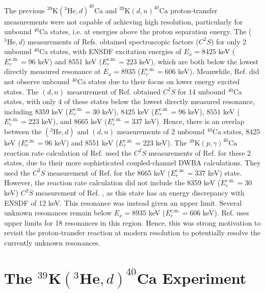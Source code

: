 The previous $^{39}\mathrm{K}(^{3}\mathrm{He},d)^{40}\mathrm{Ca}$ \cite{Erskine1966,Seth1967,Forster1970,Cage1971} and $^{39}\mathrm{K}(d,n)^{40}\mathrm{Ca}$ \cite{Fuchs1969} proton-transfer measurements were not capable of achieving high resolution, particularly for unbound $^{40}$Ca states, i.e. at energies above the proton separation energy. The ($^{3}\mathrm{He},d$) measurements of Refs. \cite{Erskine1966,Seth1967,Cage1971} obtained spectroscopic factors ($C^{2}S$) for only 2 unbound $^{40}$Ca states, with ENSDF \cite{Chen2017} excitation energies of $E_{x} = 8425$ keV ($E^{\mathrm{c.m.}}_{r} = 96$ keV) and 8551 keV ($E^{\mathrm{c.m.}}_{r} = 223$ keV), which are both below the lowest directly measured resonance at $E_{x} = 8935$ ($E^{\mathrm{c.m.}}_{r} = 606$ keV). Meanwhile, Ref. \cite{Forster1970} did not observe unbound $^{40}$Ca states due to their focus on lower energy excited states. The $(d,n)$ measurement of Ref. \cite{Fuchs1969} obtained $C^{2}S$ for 14 unbound $^{40}$Ca states, with only 4 of these states below the lowest directly measured resonance, including $8359$ keV ($E^{\mathrm{c.m.}}_{r} = 30$ keV), $8425$ keV ($E^{\mathrm{c.m.}}_{r} = 96$ keV), $8551$ keV ($E^{\mathrm{c.m.}}_{r} = 223$ keV), and $8665$ keV ($E^{\mathrm{c.m.}}_{r} = 337$ keV). Hence, there is an overlap between the $(^{3}\mathrm{He},d)$ and $(d,n)$ measurements of 2 unbound $^{40}$Ca states, 8425 keV ($E^{\mathrm{c.m.}}_{r} = 96$ keV) and 8551 keV ($E^{\mathrm{c.m.}}_{r} = 223$ keV). The $^{39}\mathrm{K}(p,\gamma)^{40}\mathrm{Ca}$ reaction rate calculation of Ref. \cite{Longland2018} used the $C^{2}S$ measurements of Ref. \cite{Cage1971} for these 2 states, due to their more sophisticated coupled-channel DWBA calculations. They used the $C^{2}S$ measurement of Ref. \cite{Fuchs1969} for the 8665 keV ($E^{\mathrm{c.m.}}_{r} = 337$ keV) state. However, the reaction rate calculation did not include the 8359 keV ($E^{\mathrm{c.m.}}_{r} = 30$ keV) $C^{2}S$ measurement of Ref. \cite{Fuchs1969}, as this state has an energy discrepancy with ENSDF \cite{Chen2017} of 12 keV. This resonance was instead given an upper limit. Several unknown resonances remain below $E_{x} = 8935$ keV ($E^{\mathrm{c.m.}}_{r} = 606$ keV). Ref. \cite{Longland2018} uses upper limits for 18 resonances in this region. Hence, this was strong motivation to revisit the proton-transfer reaction at modern resolution to potentially resolve the currently unknown resonances.

\section{The $^{39}\mathrm{\textbf{K}}(^{3}\mathrm{\textbf{He}},d)^{40}\mathrm{\textbf{Ca}}$ Experiment} \label{sec:exp_3He_d}

